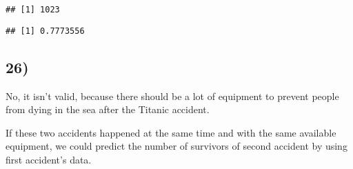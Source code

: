 \documentclass[
]{article}
\newenvironment{Shaded}{\begin{snugshade}}{\end{snugshade}}
\newcommand{\FunctionTok}[1]{\textcolor[rgb]{0.00,0.00,0.00}{#1}}
\newcommand{\NormalTok}[1]{#1}
\newcommand{\SpecialCharTok}[1]{\textcolor[rgb]{0.00,0.00,0.00}{#1}}
\begin{document}
\begin{verbatim}
## [1] 1023
\end{verbatim}

\begin{Shaded}
\end{Shaded}

\begin{verbatim}
## [1] 0.7773556
\end{verbatim}

\hypertarget{section-24}{%
\subsection{26)}\label{section-24}}

No, it isn't valid, because there should be a lot of equipment to
prevent people from dying in the sea after the Titanic accident.

If these two accidents happened at the same time and with the same
available equipment, we could predict the number of survivors of second
accident by using first accident's data.
\end{document}
